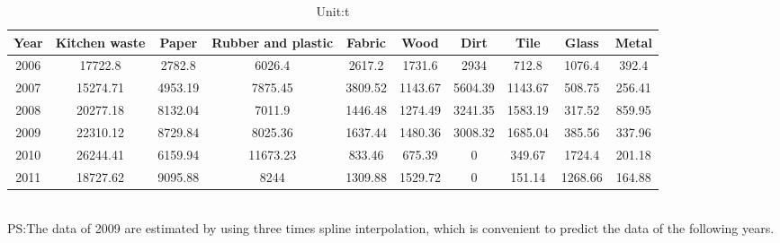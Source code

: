\documentclass[UTF8]{article}
\begin{document}
\begin{table}[h]
\caption{Unit:t}
\begin{center}
\begin{tabular}{cccccccccc}
\hline
Year&Kitchen waste&Paper&Rubber and plastic&Fabric&Wood&Dirt&Tile&Glass&Metal\\
\hline
2006&17722.8&2782.8&6026.4&2617.2&1731.6&2934&712.8&1076.4&392.4\\
\hline
2007&15274.71&4953.19&7875.45&3809.52&1143.67&5604.39&1143.67&508.75&256.41\\
\hline
2008&20277.18&8132.04&7011.9&1446.48&1274.49&3241.35&1583.19&317.52&859.95\\
\hline
2009&22310.12&8729.84&8025.36&1637.44&1480.36&3008.32&1685.04&385.56&337.96\\
\hline
2010&26244.41&6159.94&11673.23&833.46&675.39&0&349.67&1724.4&201.18\\
\hline
2011&18727.62&9095.88&8244&1309.88&1529.72&0&151.14&1268.66&164.88\\
\hline
\end{tabular}
\end{center}
\end{table}\\
\indent PS:The data of 2009 are estimated by using three times spline interpolation, which is convenient to predict the data of the following years.
\end{document}
